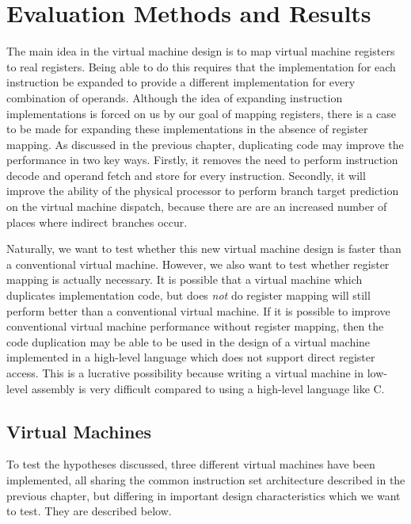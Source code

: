 \chapter{Evaluation Methods and Results}
	The main idea in the virtual machine design is to map virtual machine registers to real registers. Being able to do this requires that the implementation for each instruction be expanded to provide a different implementation for every combination of operands. Although the idea of expanding instruction implementations is forced on us by our goal of mapping registers, there is a case to be made for expanding these implementations in the absence of register mapping. As discussed in the previous chapter, duplicating code may improve the performance in two key ways. Firstly, it removes the need to perform instruction decode and operand fetch and store for every instruction. Secondly, it will improve the ability of the physical processor to perform branch target prediction on the virtual machine dispatch, because there are are an increased number of places where indirect branches occur.
	
	Naturally, we want to test whether this new virtual machine design is faster than a conventional virtual machine. However, we also want to test whether register mapping is actually necessary. It is possible that a virtual machine which duplicates implementation code, but does \emph{not} do register mapping will still perform better than a conventional virtual machine. If it is possible to improve conventional virtual machine performance without register mapping, then the code duplication may be able to be used in the design of a virtual machine implemented in a high-level language which does not support direct register access. This is a lucrative possibility because writing a virtual machine in low-level assembly is very difficult compared to using a high-level language like C.
	
	\section{Virtual Machines}
	To test the hypotheses discussed, three different virtual machines have been implemented, all sharing the common instruction set architecture described in the previous chapter, but differing in important design characteristics which we want to test. They are described below.
	
